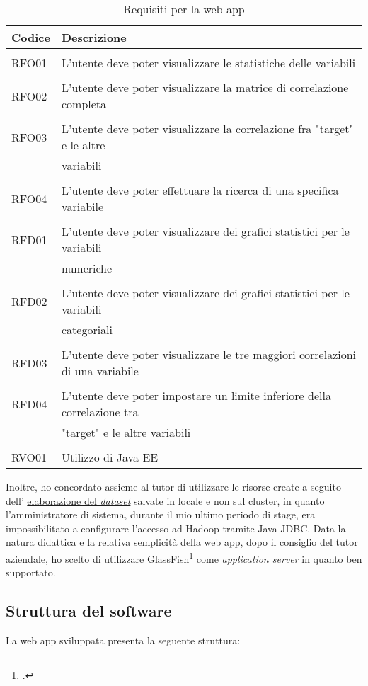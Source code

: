 \begin{table}[!h] %
	\caption{Requisiti per la web app}
	\label{tab:requisiti-app}
	\begin{tabular}{ l | l }
		\textbf{Codice} & \textbf{Descrizione}\\
		\hline
		\hline
		\\[-2mm]
		RFO01 & L'utente deve poter visualizzare le statistiche delle variabili \\
		\hline
		\\[-2mm]
		RFO02 & L'utente deve poter visualizzare la matrice di correlazione completa \\
		\hline
		\\[-2mm]
		RFO03 & L'utente deve poter visualizzare la correlazione fra "target" e le altre \\ & variabili \\
		\hline
		\\[-2mm]
		RFO04 & L'utente deve poter effettuare la ricerca di una specifica variabile \\
		\hline
		\hline
		\\[-2mm]
		RFD01 & L'utente deve poter visualizzare dei grafici statistici per le variabili \\ & numeriche \\
		\hline
		\\[-2mm]
		RFD02 & L'utente deve poter visualizzare dei grafici statistici per le variabili \\ & categoriali \\
		\hline
		\\[-2mm]
		RFD03 & L'utente deve poter visualizzare le tre maggiori correlazioni di una variabile \\
		\hline
		\\[-2mm]
		RFD04 & L'utente deve poter impostare un limite inferiore della correlazione tra \\ & "target" e le altre variabili \\
		\hline
		\hline
		\\[-2mm]
		RVO01 & Utilizzo di Java EE \\
		\hline
		\end{tabular}
\end{table}%
Inoltre, ho concordato assieme al tutor di utilizzare le risorse create a seguito dell' \hyperref[dataseta]{elaborazione del \textit{dataset}} salvate in locale e non sul \gls{cluster}, in quanto l'amministratore di sistema, durante il mio ultimo periodo di stage, era impossibilitato a configurare l'accesso ad Hadoop tramite \gls{Java JDBC}. 
Data la natura didattica e la relativa semplicità della \gls{web app}, dopo il consiglio del tutor aziendale, ho scelto di utilizzare GlassFish\footcite{https://javaee.github.io/glassfish/} come \textit{application server} in quanto ben supportato.

\subsection{Struttura del software}
La \gls{web app} sviluppata presenta la seguente struttura:

